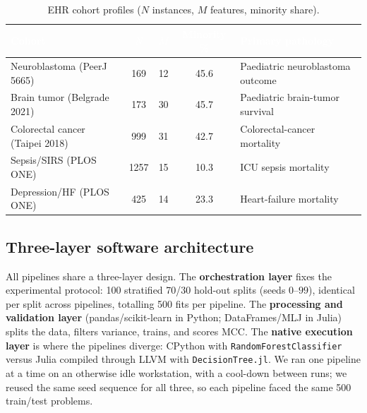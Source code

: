 \documentclass[11pt,a4paper]{article}
\newcommand{\code}[1]{\texttt{\small\color{primarydark}#1}}
\begin{document}
\begin{table}[H]
\centering
\footnotesize
\caption{EHR cohort profiles ($N$ instances, $M$ features, minority share).}
\label{tab:datasets}
\begin{tabularx}{\textwidth}{l c c c X}
\toprule
\rowcolor{primarydark}
\textcolor{white}{\textbf{Cohort}} &
\textcolor{white}{\textbf{$N$}} & \textcolor{white}{\textbf{$M$}} &
\textcolor{white}{\textbf{Minority \%}} & \textcolor{white}{\textbf{Primary pathology}} \\
\midrule
Neuroblastoma (PeerJ 5665) & 169 & 12 & 45.6 & Paediatric neuroblastoma outcome \\
Brain tumor (Belgrade 2021) & 173 & 30 & 45.7 & Paediatric brain-tumor survival \\
Colorectal cancer (Taipei 2018) & 999 & 31 & 42.7 & Colorectal-cancer mortality \\
Sepsis/SIRS (PLOS ONE) & 1257 & 15 & 10.3 & ICU sepsis mortality \\
Depression/HF (PLOS ONE) & 425 & 14 & 23.3 & Heart-failure mortality \\
\bottomrule
\end{tabularx}
\end{table}

\subsection{Three-layer software architecture}
All pipelines share a three-layer design. The \textbf{orchestration layer}
fixes the experimental protocol: 100 stratified 70/30 hold-out splits (seeds
$0$--$99$), identical per split across pipelines, totalling 500 fits per
pipeline. The \textbf{processing and validation layer} (pandas/scikit-learn in
Python; DataFrames/MLJ in Julia) splits the data, filters variance, trains,
and scores MCC. The \textbf{native execution layer} is where the pipelines
diverge: CPython with \code{RandomForestClassifier} versus Julia compiled
through LLVM with \code{DecisionTree.jl}. We ran one pipeline at a time on an
otherwise idle workstation, with a cool-down between runs; we reused the same
seed sequence for all three, so each pipeline faced the same 500 train/test
problems.
\end{document}
